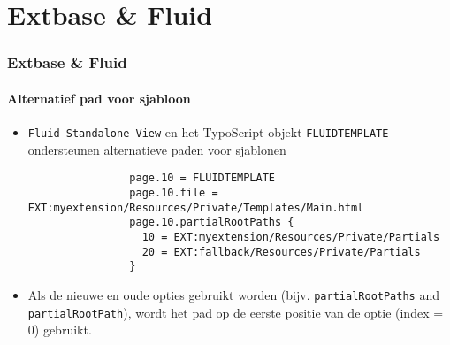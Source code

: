 %

\section{Extbase \& Fluid}


\begin{frame}[fragile]
	\frametitle{Extbase \& Fluid}
	\framesubtitle{Alternatief pad voor sjabloon}

	\lstset{
		basicstyle=\tiny\ttfamily
	}

	\begin{itemize}
		\item \texttt{Fluid Standalone View} en het TypoScript-objekt \texttt{FLUIDTEMPLATE} ondersteunen alternatieve paden voor sjablonen

			\begin{lstlisting}
				page.10 = FLUIDTEMPLATE
				page.10.file = EXT:myextension/Resources/Private/Templates/Main.html
				page.10.partialRootPaths {
				  10 = EXT:myextension/Resources/Private/Partials
				  20 = EXT:fallback/Resources/Private/Partials
				}
			\end{lstlisting}

		\item Als de nieuwe en oude opties gebruikt worden (bijv. \texttt{partialRootPaths} and \texttt{partialRootPath}),
			wordt het pad op de eerste positie van de optie (index = 0) gebruikt.

	\end{itemize}

\end{frame}

